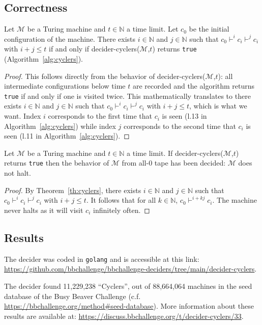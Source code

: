 \subsection{Correctness}



\begin{theorem}\label{th:cyclers}\normalfont Let $\mathcal{M}$ be a Turing machine and $t \in \mathbb{N}$ a time limit. Let $c_0$ be the initial configuration of the machine. There exists $i\in\mathbb{N}$ and $j\in\mathbb{N}$ such that $c_0 \vdash^i c_i \vdash^j c_i$ with $i+j \leq t$ if and only if {\sc decider-cyclers}($\mathcal{M}$,$t$) returns \texttt{true} (Algorithm~\ref{alg:cyclers}).
\end{theorem}
\begin{proof}
        This follows directly from the behavior of {\sc decider-cyclers}($\mathcal{M}$,$t$): all intermediate configurations below time $t$ are recorded and the algorithm returns \texttt{true} if and only if one is visited twice. This mathematically translates to
        there exists $i\in\mathbb{N}$ and $j\in\mathbb{N}$ such that $c_0 \vdash^i c_i \vdash^j c_i$ with $i+j \leq t$, which is what we want. Index $i$ corresponds to the first time that $c_i$ is seen (l.13 in Algorithm~\ref{alg:cyclers}) while index $j$ corresponds to the second time that $c_i$ is seen (l.11 in Algorithm~\ref{alg:cyclers}).
\end{proof}

\begin{corollary}\normalfont
        Let $\mathcal{M}$ be a Turing machine and $t \in \mathbb{N}$ a time limit. If {\sc decider-cyclers}($\mathcal{M}$,$t$) returns \texttt{true} then the behavior of $\mathcal{M}$ from all-0 tape has been decided: $\mathcal{M}$ does not halt.
\end{corollary}
\begin{proof}
        By Theorem~\ref{th:cyclers}, there exists $i\in\mathbb{N}$ and $j\in\mathbb{N}$ such that $c_0 \vdash^i c_i \vdash^j c_i$ with $i+j \leq t$. It follows that for all $k\in\mathbb{N}$, $c_0 \vdash^{i+kj} c_i$. The machine never halts as it will visit $c_i$ infinitely often.
\end{proof}

\subsection{Results}

The decider was coded in \texttt{golang} and is accessible at this link: \url{https://github.com/bbchallenge/bbchallenge-deciders/tree/main/decider-cyclers}.

The decider found 11,229,238 ``Cyclers'', out of 88,664,064 machines in the seed database of the Busy Beaver Challenge (c.f. \url{https://bbchallenge.org/method#seed-database}). More information about these results are available at: \url{https://discuss.bbchallenge.org/t/decider-cyclers/33}.
